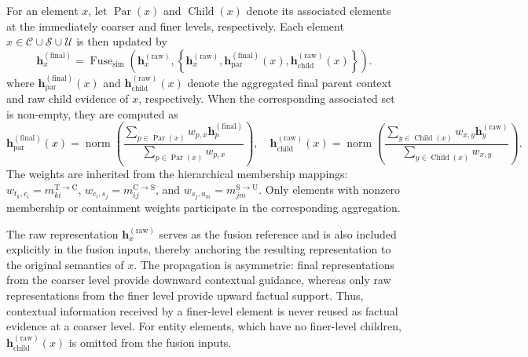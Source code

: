\documentclass{article} %
\begin{document}
For an element $x$, let $\operatorname{Par}(x)$ and $\operatorname{Child}(x)$ denote its associated elements at the immediately coarser and finer levels, respectively. Each element $x\in\mathcal{C}\cup\mathcal{S}\cup\mathcal{U}$ is then updated by
\begin{equation}
\mathbf{h}_{x}^{(\mathrm{final})}
=
\operatorname{Fuse}_{\mathrm{sim}}\!\left(
\mathbf{h}_{x}^{(\mathrm{raw})},
\left\{
\mathbf{h}_{x}^{(\mathrm{raw})},
\mathbf{h}_{\mathrm{par}}^{(\mathrm{final})}(x),
\mathbf{h}_{\mathrm{child}}^{(\mathrm{raw})}(x)
\right\}
\right).
\label{eq:asymmetric_propagation}
\end{equation}
where $\mathbf{h}_{\mathrm{par}}^{(\mathrm{final})}(x)$ and $\mathbf{h}_{\mathrm{child}}^{(\mathrm{raw})}(x)$ denote the aggregated final parent context and raw child evidence of $x$, respectively. When the corresponding associated set is non-empty, they are computed as
\begin{equation}
\mathbf{h}_{\mathrm{par}}^{(\mathrm{final})}(x)
=
\operatorname{norm}\!\left(
\frac{
\sum_{p\in\operatorname{Par}(x)}
w_{p,x}\mathbf{h}_{p}^{(\mathrm{final})}
}{
\sum_{p\in\operatorname{Par}(x)} w_{p,x}
}
\right),
\quad
\mathbf{h}_{\mathrm{child}}^{(\mathrm{raw})}(x)
=
\operatorname{norm}\!\left(
\frac{
\sum_{y\in\operatorname{Child}(x)}
w_{x,y}\mathbf{h}_{y}^{(\mathrm{raw})}
}{
\sum_{y\in\operatorname{Child}(x)} w_{x,y}
}
\right).
\label{eq:parent_child_aggregation}
\end{equation}
The weights are inherited from the hierarchical membership mappings: $w_{t_k,c_i}=m_{ki}^{\mathrm{T}\to\mathrm{C}}$, $w_{c_i,s_j}=m_{ij}^{\mathrm{C}\to\mathrm{S}}$, and $w_{s_j,u_m}=m_{jm}^{\mathrm{S}\to\mathrm{U}}$. Only elements with nonzero membership or containment weights participate in the corresponding aggregation.

The raw representation $\mathbf{h}_{x}^{(\mathrm{raw})}$ serves as the fusion reference and is also included explicitly in the fusion inputs, thereby anchoring the resulting representation to the original semantics of $x$. The propagation is asymmetric: final representations from the coarser level provide downward contextual guidance, whereas only raw representations from the finer level provide upward factual support. Thus, contextual information received by a finer-level element is never reused as factual evidence at a coarser level. For entity elements, which have no finer-level children, $\mathbf{h}_{\mathrm{child}}^{(\mathrm{raw})}(x)$ is omitted from the fusion inputs.
\end{document}
